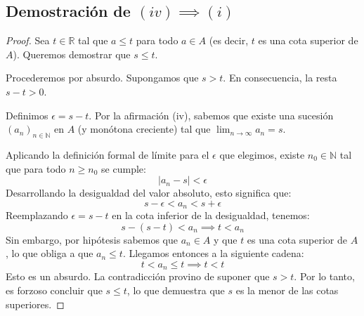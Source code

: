 \documentclass[11pt, a4paper]{article}
\newcommand{\R}{\mathbb{R}}
\newcommand{\N}{\mathbb{N}}
\begin{document}
	\subsection*{Demostración de $(iv) \implies (i)$}
	\begin{proof}
		Sea $t \in \R$ tal que $a \leq t$ para todo $a \in A$ (es decir, $t$ es una cota superior de $A$). Queremos demostrar que $s \leq t$.
		
		Procederemos por absurdo. Supongamos que $s > t$. En consecuencia, la resta $s - t > 0$. 
		
		Definimos $\epsilon = s - t$. Por la afirmación (iv), sabemos que existe una sucesión $(a_n)_{n \in \N}$ en $A$ (y monótona creciente) tal que $\lim_{n \to \infty} a_n = s$.
		
		Aplicando la definición formal de límite para el $\epsilon$ que elegimos, existe $n_0 \in \N$ tal que para todo $n \geq n_0$ se cumple:
		\[
		|a_n - s| < \epsilon
		\]
		Desarrollando la desigualdad del valor absoluto, esto significa que:
		\[
		s - \epsilon < a_n < s + \epsilon
		\]
		Reemplazando $\epsilon = s - t$ en la cota inferior de la desigualdad, tenemos:
		\[
		s - (s - t) < a_n \implies t < a_n
		\]
		Sin embargo, por hipótesis sabemos que $a_n \in A$ y que $t$ es una cota superior de $A$, lo que obliga a que $a_n \leq t$. 
		Llegamos entonces a la siguiente cadena:
		\[
		t < a_n \leq t \implies t < t
		\]
		Esto es un absurdo. La contradicción provino de suponer que $s > t$. Por lo tanto, es forzoso concluir que $s \leq t$, lo que demuestra que $s$ es la menor de las cotas superiores.
	\end{proof}
	
\end{document}
